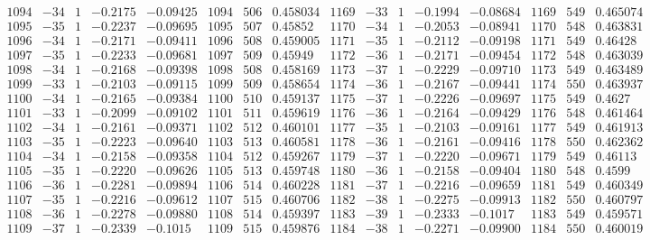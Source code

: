 \documentclass[11pt,reqno,a4letter]{article}
\numberwithin{figure}{section}
\numberwithin{table}{section}
\theoremstyle{plain}
\numberwithin{theorem}{section}
\theoremstyle{definition}
\begin{document}
\begin{table}[ht]
\begin{equation*}
{\begin{array}{ccccc|ccc|ccccc|ccc}
 1094 & -34 & 1 & -0.2175 & -0.09425 & 1094 & 506 & 0.458034 & 1169 & -33 & 1 & -0.1994 & -0.08684 & 1169 & 549 & 0.465074 \\
 1095 & -35 & 1 & -0.2237 & -0.09695 & 1095 & 507 & 0.45852 & 1170 & -34 & 1 & -0.2053 & -0.08941 & 1170 & 548 & 0.463831 \\
 1096 & -34 & 1 & -0.2171 & -0.09411 & 1096 & 508 & 0.459005 & 1171 & -35 & 1 & -0.2112 & -0.09198 & 1171 & 549 & 0.46428 \\
 1097 & -35 & 1 & -0.2233 & -0.09681 & 1097 & 509 & 0.45949 & 1172 & -36 & 1 & -0.2171 & -0.09454 & 1172 & 548 & 0.463039 \\
 1098 & -34 & 1 & -0.2168 & -0.09398 & 1098 & 508 & 0.458169 & 1173 & -37 & 1 & -0.2229 & -0.09710 & 1173 & 549 & 0.463489 \\
 1099 & -33 & 1 & -0.2103 & -0.09115 & 1099 & 509 & 0.458654 & 1174 & -36 & 1 & -0.2167 & -0.09441 & 1174 & 550 & 0.463937 \\
 1100 & -34 & 1 & -0.2165 & -0.09384 & 1100 & 510 & 0.459137 & 1175 & -37 & 1 & -0.2226 & -0.09697 & 1175 & 549 & 0.4627 \\
 1101 & -33 & 1 & -0.2099 & -0.09102 & 1101 & 511 & 0.459619 & 1176 & -36 & 1 & -0.2164 & -0.09429 & 1176 & 548 & 0.461464 \\
 1102 & -34 & 1 & -0.2161 & -0.09371 & 1102 & 512 & 0.460101 & 1177 & -35 & 1 & -0.2103 & -0.09161 & 1177 & 549 & 0.461913 \\
 1103 & -35 & 1 & -0.2223 & -0.09640 & 1103 & 513 & 0.460581 & 1178 & -36 & 1 & -0.2161 & -0.09416 & 1178 & 550 & 0.462362 \\
 1104 & -34 & 1 & -0.2158 & -0.09358 & 1104 & 512 & 0.459267 & 1179 & -37 & 1 & -0.2220 & -0.09671 & 1179 & 549 & 0.46113 \\
 1105 & -35 & 1 & -0.2220 & -0.09626 & 1105 & 513 & 0.459748 & 1180 & -36 & 1 & -0.2158 & -0.09404 & 1180 & 548 & 0.4599 \\
 1106 & -36 & 1 & -0.2281 & -0.09894 & 1106 & 514 & 0.460228 & 1181 & -37 & 1 & -0.2216 & -0.09659 & 1181 & 549 & 0.460349 \\
 1107 & -35 & 1 & -0.2216 & -0.09612 & 1107 & 515 & 0.460706 & 1182 & -38 & 1 & -0.2275 & -0.09913 & 1182 & 550 & 0.460797 \\
 1108 & -36 & 1 & -0.2278 & -0.09880 & 1108 & 514 & 0.459397 & 1183 & -39 & 1 & -0.2333 & -0.1017 & 1183 & 549 & 0.459571 \\
 1109 & -37 & 1 & -0.2339 & -0.1015 & 1109 & 515 & 0.459876 & 1184 & -38 & 1 & -0.2271 & -0.09900 & 1184 & 550 & 0.460019 \\

\end{array}}
\end{equation*}
\end{table}
\end{document}
